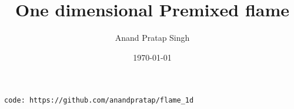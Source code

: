 \documentclass[%
notitlepage,
]{revtex4-1}
\begin{document}
\preprint{}

\title[]{One dimensional Premixed flame }%

\author{Anand Pratap Singh}
%

\date{\today}%

\begin{abstract}

\end{abstract}

\titlepage
\vspace{1cm}
\texttt{code: https://github.com/anandpratap/flame\_1d}
\end{document}
